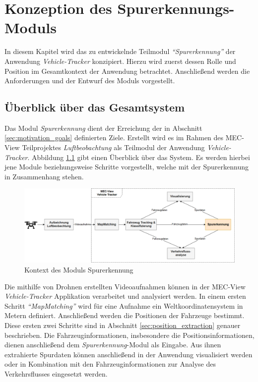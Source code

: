 
\chapter{Konzeption des Spurerkennungs-Moduls}
\label{cha:konzeption}

In diesem Kapitel wird das zu entwickelnde Teilmodul \textit{``Spurerkennung''}
der Anwendung \textit{Vehicle-Tracker} konzipiert. Hierzu wird zuerst dessen Rolle und Position im Gesamtkontext
der Anwendung betrachtet. Anschließend werden die Anforderungen und der Entwurf des Moduls vorgestellt.

\section{Überblick über das Gesamtsystem}

Das Modul \textit{Spurerkennung} dient der Erreichung der in Abschnitt
\ref{sec:motivation_goals} definierten Ziele. Erstellt wird es im Rahmen des MEC-View Teilprojektes
\textit{Luftbeobachtung} als Teilmodul der Anwendung \textit{Vehicle-Tracker}.
Abbildung \ref{fig:concept_laneDetection_context} gibt einen Überblick über das System.
Es werden hierbei jene Module beziehungsweise Schritte vorgestellt, welche mit der Spurerkennung in
Zusammenhang stehen.

\begin{figure}[H]
    \centering
    \includegraphics[width=\linewidth]{resources/img/konzeption/Context_LaneDetection}
    \caption{Kontext des Moduls Spurerkennung}
    \label{fig:concept_laneDetection_context}
\end{figure}

Die mithilfe von Drohnen erstellten Videoaufnahmen können in der MEC-View \textit{Vehicle-Tracker} Applikation
verarbeitet und analysiert werden. In einem ersten Schritt \textit{``MapMatching''} wird für eine Aufnahme
ein Weltkoordinatensystem in Metern definiert. Anschließend werden die Positionen
der Fahrzeuge bestimmt. Diese ersten zwei Schritte sind in Abschnitt \ref{sec:position_extraction} genauer beschrieben.
Die Fahrzeuginformationen, insbesondere die Positionsinformationen, dienen anschließend dem \textit{Spurerkennung}-Modul
als Eingabe. Aus ihnen extrahierte Spurdaten können anschließend in der Anwendung visualisiert werden oder in Kombination
mit den Fahrzeuginformationen zur Analyse des Verkehrsflusses eingesetzt werden.


